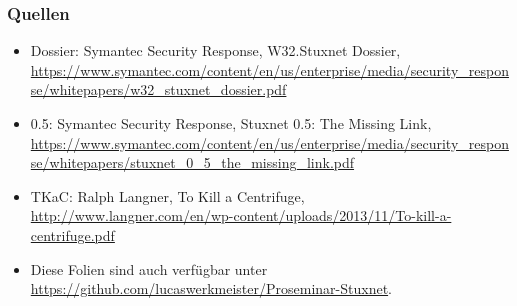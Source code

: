 \documentclass{beamer}
\begin{document}
\begin{frame}
  \frametitle{Quellen}
  \fontsize{6pt}{7.2}\selectfont
  \begin{itemize}
    \item Dossier: Symantec Security Response, W32.Stuxnet Dossier, \url{https://www.symantec.com/content/en/us/enterprise/media/security_response/whitepapers/w32_stuxnet_dossier.pdf}
    \item 0.5: Symantec Security Response, Stuxnet 0.5: The Missing Link, \url{https://www.symantec.com/content/en/us/enterprise/media/security_response/whitepapers/stuxnet_0_5_the_missing_link.pdf}
    \item TKaC: Ralph Langner, To Kill a Centrifuge, \url{http://www.langner.com/en/wp-content/uploads/2013/11/To-kill-a-centrifuge.pdf}
    \item Diese Folien sind auch verfügbar unter \url{https://github.com/lucaswerkmeister/Proseminar-Stuxnet}.
  \end{itemize}
\end{frame}

\immediate\closeout\notesfile
\end{document}
